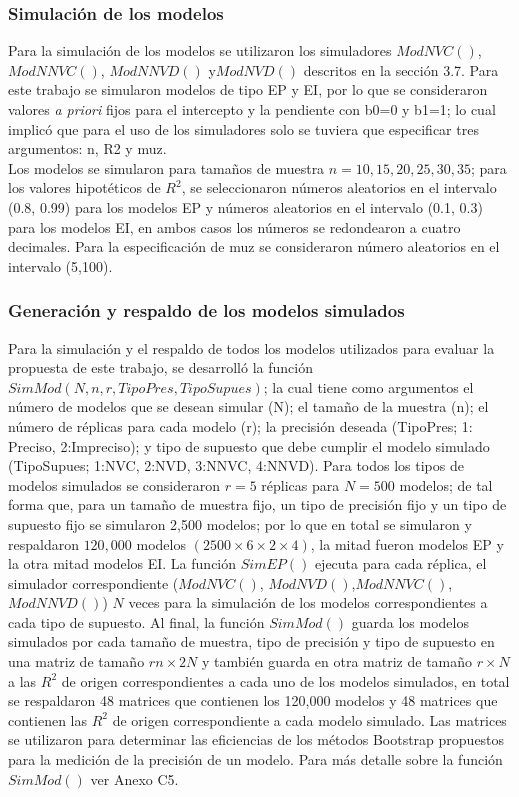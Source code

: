 \subsubsection{Simulación de los modelos}
Para la simulación de los modelos se utilizaron los simuladores $ModNVC()$, $ModNNVC()$, $ModNNVD()$ y$ ModNVD()$ descritos en la sección 3.7. Para este trabajo se simularon modelos de tipo EP y EI, por lo que se consideraron valores \textit{a priori} fijos para el intercepto y la pendiente con b0=0 y b1=1; lo cual implicó que para el uso de los simuladores solo se tuviera que especificar tres argumentos: n, R2 y muz.\\

Los modelos se simularon para tamaños de muestra $n=10, 15, 20, 25, 30, 35$; para los valores hipotéticos de $R^2$, se seleccionaron números aleatorios en el intervalo (0.8, 0.99) para los modelos EP y números aleatorios en el intervalo (0.1, 0.3) para los modelos EI, en ambos casos los números se redondearon a cuatro decimales. Para la especificación de muz se consideraron número aleatorios en el intervalo (5,100).\\
 

\subsubsection{Generación y respaldo de los modelos simulados}

Para la simulación y el respaldo de todos los modelos utilizados para evaluar la propuesta de este trabajo, se desarrolló la función $SimMod(N,n,r,TipoPres,TipoSupues)$; la cual tiene como argumentos el número de modelos que se desean simular (N); el tamaño de la muestra (n); el número de réplicas para cada modelo (r);  la precisión deseada (TipoPres; 1: Preciso, 2:Impreciso); y tipo de supuesto que debe cumplir el modelo simulado (TipoSupues; 1:NVC, 2:NVD, 3:NNVC, 4:NNVD). Para todos los tipos de modelos simulados se consideraron $r=5$ réplicas para $N=500$ modelos; de tal forma que, para un tamaño de muestra fijo, un tipo de precisión fijo y un tipo de supuesto fijo se simularon 2,500 modelos; por lo que en total se simularon y respaldaron $120,000$ modelos $(2500 \times 6 \times 2 \times 4)$, la mitad fueron modelos EP y la otra mitad modelos EI.
La función $SimEP()$ ejecuta para cada réplica, el simulador correspondiente ($ModNVC()$, $ModNVD()$,$ ModNNVC()$,$ ModNNVD()$) $N$ veces para la simulación de los modelos correspondientes a cada tipo de supuesto. Al final, la función $SimMod()$ guarda los modelos simulados por cada tamaño de muestra, tipo de precisión y tipo de supuesto en una matriz de tamaño $rn \times 2N$ y también guarda en otra matriz de tamaño $r \times N$ a las $R^2$ de origen correspondientes a cada uno de los modelos simulados, en total se respaldaron 48 matrices que contienen los 120,000 modelos y 48 matrices que contienen las $R^2$ de origen correspondiente a cada modelo simulado. Las matrices se utilizaron para determinar las eficiencias de los métodos Bootstrap propuestos para la medición de la precisión de un modelo. Para más detalle sobre la función $SimMod()$ ver Anexo C5.\\

